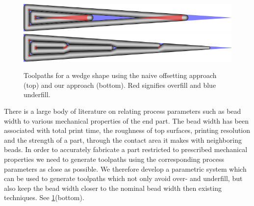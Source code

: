 \begin{figure}\centering
\includegraphics[width=\columnwidth]{sources/intro/TEST_naive_pretty.png}
\includegraphics[width=\columnwidth]{sources/intro/TEST_Distributed_pretty.png}
\caption{
Toolpaths for a wedge shape using the naive offsetting approach (top) and our approach (bottom).
Red signifies overfill and blue underfill.
}
\label{intro_wedge}
\end{figure}



There is a large body of literature on relating process parameters such as bead width to various mechanical properties of the end part.
The bead width has been associated with total print time, the roughness of top surfaces, printing resolution and the strength of a part, through the contact area it makes with neighboring beads. \cite{N.Turner2014,ahn2002anisotropic}
In order to accurately fabricate a part restricted to prescribed mechanical properties we need to generate toolpaths using the corresponding process parameters as close as possible.
We therefore develop a parametric system which can be used to generate toolpaths which not only avoid over- and underfill, but also keep the bead width closer to the nominal bead width then existing techniques.
See \cref{intro_wedge}(bottom).


